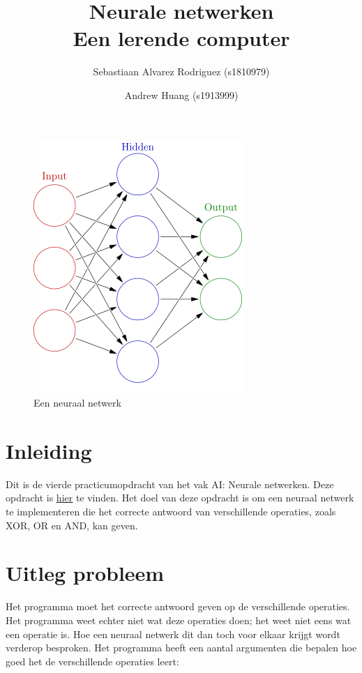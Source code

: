 \documentclass[10pt]{article}
\author{Sebastiaan Alvarez Rodriguez (s1810979) \and Andrew Huang (s1913999)}
\title{
    Neurale netwerken \\
        \large Een lerende computer
}
\begin{document}

\maketitle
\begin{figure}[h]
	\begin{center}
		\includegraphics[]{images/nn.png}
		\caption{Een neuraal netwerk \cite{image}}
	\end{center}
\end{figure}

\clearpage

\section{Inleiding}
Dit is de vierde practicumopdracht van het vak AI: Neurale netwerken. Deze opdracht is \href{http://liacs.leidenuniv.nl/~kosterswa/AI/nn18.html}{\underline{hier}} \cite{assignment} te vinden.
Het doel van deze opdracht is om een neuraal netwerk te implementeren die het correcte antwoord van verschillende operaties, zoals XOR, OR en AND, kan geven.

\section{Uitleg probleem}
Het programma moet het correcte antwoord geven op de verschillende operaties. Het programma weet echter niet wat deze operaties doen; het weet niet eens wat een operatie is. Hoe een neuraal netwerk dit dan toch voor elkaar krijgt wordt verderop besproken. Het programma heeft een aantal argumenten die bepalen hoe goed het de verschillende operaties leert:
\end{document}
